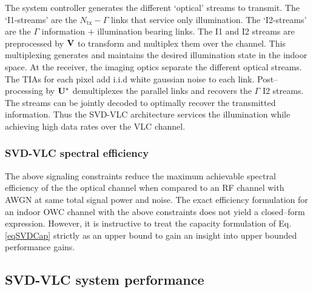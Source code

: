 The system controller generates the different `optical' streams to transmit. The `I1-streams' are the $N_{\text{tx}}-\Gamma$ links that service only illumination. The `I2-streams' are the $\Gamma$ information $+$ illumination bearing links. The I1 and I2 streams are preprocessed by ${\bf{V}}$ to transform and multiplex them over the channel. This multiplexing generates and maintains the desired illumination state in the indoor space. At the receiver, the imaging optics separate the different optical streams. The TIAs for each pixel add i.i.d white gaussian noise to each link. Post--processing by ${\bf{U^{*}}}$ demultiplexes the parallel links and recovers the $\Gamma$ I2 streams. The streams can be jointly decoded to optimally recover the transmitted information. Thus the SVD-VLC architecture services the illumination while achieving high data rates over the VLC channel. 

%

\subsubsection{SVD-VLC spectral efficiency}
\label{subsubsec:svdvlcSpectralEfficiency}
The above signaling constraints reduce the maximum achievable spectral efficiency of the the optical channel when compared to an RF channel with AWGN at same total signal power and noise. The exact efficiency formulation for an indoor OWC channel with the above constraints does not yield a closed--form expression. However, it is instructive to treat the capacity formulation of Eq. \eqref{eqSVDCap} strictly as an upper bound to gain an insight into upper bounded performance gains.

\subsection{SVD-VLC system performance}
\label{sec:analysis}

